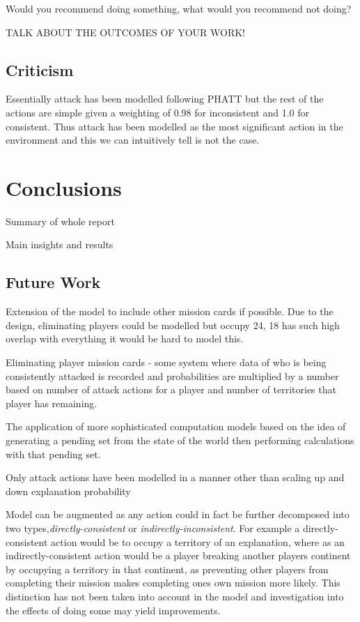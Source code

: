\documentclass[parskip]{cs4rep}
\begin{document}
Would you recommend doing something, what would you recommend not doing?

TALK ABOUT THE OUTCOMES OF YOUR WORK!

\section{Criticism}

Essentially attack has been modelled following PHATT but the rest of the actions are simple given a weighting of 0.98 for inconsistent and 1.0 for consistent. Thus attack has been modelled as the most significant action in the environment and this we can intuitively tell is not the case.

\chapter{Conclusions}

Summary of whole report

Main insights and results

\section{Future Work}

Extension of the model to include other mission cards if possible. Due to the design, eliminating players could be modelled but occupy 24, 18 has such high overlap with everything it would be hard to model this.

Eliminating player mission cards - some system where data of who is being consistently attacked is recorded and probabilities are multiplied by a number based on number of attack actions for a player and number of territories that player has remaining.

The application of more sophisticated computation models based on the idea of generating a pending set from the state of the world then performing calculations with that pending set.

Only attack actions have been modelled in a manner other than scaling up and down explanation probability

Model can be augmented as any action could in fact be further decomposed into two types,\textit{directly-consistent} or \textit{indirectly-inconsistent}. For example a directly-consistent action would be to occupy a territory of an explanation, where as an indirectly-consistent action would be a player breaking another players continent by occupying a territory in that continent, as preventing other players from completing their mission makes completing ones own mission more likely. This distinction has not been taken into account in the model and investigation into the effects of doing some may yield improvements.
\end{document}

